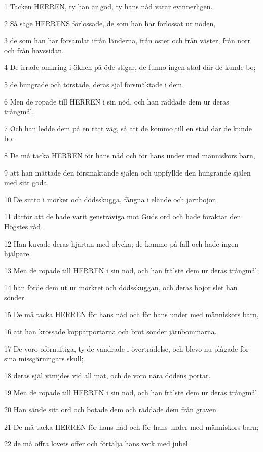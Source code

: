\par 1 Tacken HERREN, ty han är god, ty hans nåd varar evinnerligen.
\par 2 Så säge HERRENS förlossade, de som han har förlossat ur nöden,
\par 3 de som han har församlat ifrån länderna, från öster och från väster, från norr och från havssidan.
\par 4 De irrade omkring i öknen på öde stigar, de funno ingen stad där de kunde bo;
\par 5 de hungrade och törstade, deras själ försmäktade i dem.
\par 6 Men de ropade till HERREN i sin nöd, och han räddade dem ur deras trångmål.
\par 7 Och han ledde dem på en rätt väg, så att de kommo till en stad där de kunde bo.
\par 8 De må tacka HERREN för hans nåd och för hans under med människors barn,
\par 9 att han mättade den försmäktande själen och uppfyllde den hungrande själen med sitt goda.
\par 10 De sutto i mörker och dödsskugga, fångna i elände och järnbojor,
\par 11 därför att de hade varit gensträviga mot Guds ord och hade föraktat den Högstes råd.
\par 12 Han kuvade deras hjärtan med olycka; de kommo på fall och hade ingen hjälpare.
\par 13 Men de ropade till HERREN i sin nöd, och han frälste dem ur deras trångmål;
\par 14 han förde dem ut ur mörkret och dödsskuggan, och deras bojor slet han sönder.
\par 15 De må tacka HERREN för hans nåd och för hans under med människors barn,
\par 16 att han krossade kopparportarna och bröt sönder järnbommarna.
\par 17 De voro oförnuftiga, ty de vandrade i överträdelse, och blevo nu plågade för sina missgärningars skull;
\par 18 deras själ vämjdes vid all mat, och de voro nära dödens portar.
\par 19 Men de ropade till HERREN i sin nöd, och han frälste dem ur deras trångmål.
\par 20 Han sände sitt ord och botade dem och räddade dem från graven.
\par 21 De må tacka HERREN för hans nåd och för hans under med människors barn;
\par 22 de må offra lovets offer och förtälja hans verk med jubel.
